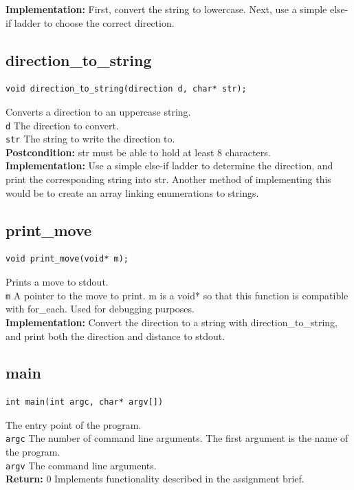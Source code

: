 \documentclass{article}
\begin{document}
 
 \textbf{Implementation:}
First, convert the string to lowercase.
Next, use a simple else-if ladder to choose the correct direction.
 

\subsection{direction\_to\_string}
\begin{lstlisting}
void direction_to_string(direction d, char* str);
\end{lstlisting}


  Converts a direction to an uppercase string.\\ 
 \texttt{d} The direction to convert.\\ 
 \texttt{str} The string to write the direction to.\\ 
 \textbf{Postcondition:}  str must be able to hold at least 8 characters.\\ 
 
 
 \textbf{Implementation:}
Use a simple else-if ladder to determine the direction,
 and print the corresponding string into  str.
Another method of implementing this would be to create an
array linking enumerations to strings.
 

\subsection{print\_move}
\begin{lstlisting}
void print_move(void* m);
\end{lstlisting}


  Prints a move to stdout.\\ 
 \texttt{m} A pointer to the  move to print.
   m is a void* so that this function is compatible with  for\_each.
     Used for debugging purposes.\\ 
 
 
 \textbf{Implementation:}
Convert the direction to a string with  direction\_to\_string,
 and print both the direction and distance to stdout.
 

\subsection{main}
\begin{lstlisting}
int main(int argc, char* argv[])
\end{lstlisting}


  The entry point of the program.\\ 
 \texttt{argc} The number of command line arguments.
     The first argument is the name of the program.\\ 
 \texttt{argv} The command line arguments.\\ 
 \textbf{Return:} 0
  Implements functionality described in the assignment brief.
 
\end{document}
